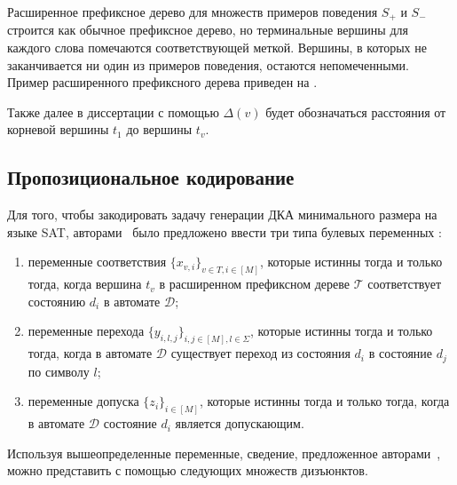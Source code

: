 Расширенное префиксное дерево для множеств примеров поведения $S_{+}$ и $S_{-}$ строится как обычное префиксное дерево, но терминальные вершины для каждого слова помечаются соответствующей меткой. Вершины, в которых не заканчивается ни один из примеров поведения, остаются непомеченными. Пример расширенного префиксного дерева приведен на .

Также далее в диссертации с помощью $\Delta(v)$ будет обозначаться расстояния от корневой вершины $t_{1}$ до вершины $t_{v}$.

\subsection{Пропозициональное кодирование}
\label{sec:review:sat-dfa-inf:hv-encoding}


Для того, чтобы закодировать задачу генерации ДКА минимального размера на языке SAT, авторами~\cite{heule-icgi10} было предложено ввести три типа булевых переменных :
\begin{enumerate}
  \item переменные соответствия $\{x_{v,i}\}_{v \in T, i \in \left[M\right]}$, которые истинны тогда и только тогда, когда вершина $t_{v}$ в расширенном префиксном дереве $\mathcal{T}$ соответствует состоянию $d_{i}$ в автомате $\mathcal{D}$;
  \item переменные перехода $\{y_{i,l,j}\}_{i,j \in \left[M\right],l \in \Sigma}$, которые истинны тогда и только тогда, когда в автомате $\mathcal{D}$ существует переход из состояния $d_{i}$ в состояние $d_{j}$ по символу $l$;
  \item переменные допуска $\{z_{i}\}_{i \in \left[M\right]}$, которые истинны тогда и только тогда, когда в автомате $\mathcal{D}$ состояние $d_{i}$ является допускающим.
\end{enumerate}

Используя вышеопределенные переменные, сведение, предложенное авторами~\cite{heule-icgi10}, можно представить с помощью следующих множеств дизъюнктов.



